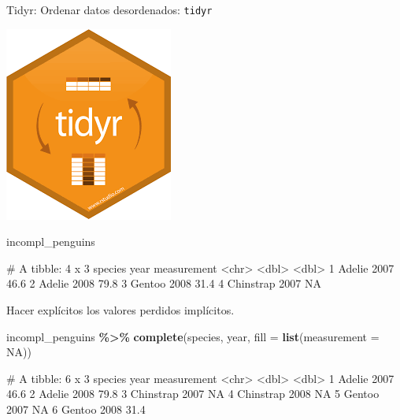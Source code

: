 \documentclass[
  ignorenonframetext,
  aspectratio=169]{beamer}
\newenvironment{Shaded}{\begin{snugshade}}{\end{snugshade}}
\newcommand{\AttributeTok}[1]{\textcolor[rgb]{0.13,0.29,0.53}{#1}}
\newcommand{\ConstantTok}[1]{\textcolor[rgb]{0.56,0.35,0.01}{#1}}
\newcommand{\FunctionTok}[1]{\textcolor[rgb]{0.13,0.29,0.53}{\textbf{#1}}}
\newcommand{\NormalTok}[1]{#1}
\newcommand{\SpecialCharTok}[1]{\textcolor[rgb]{0.81,0.36,0.00}{\textbf{#1}}}
\let\oldverbatim\verbatim
\let\endoldverbatim\endverbatim
\renewenvironment{verbatim}{\tiny\oldverbatim}{\endoldverbatim}
\begin{document}
\begin{frame}[fragile]{Tidyr: Ordenar datos desordenados:
\texttt{tidyr}}
\label{tidyr-ordenar-datos-desordenados-tidyr-14}
\begin{flushright}\includegraphics[width=0.05\linewidth]{Imgs/logo_tidyr} \end{flushright}

\begin{Shaded}
\begin{Highlighting}[]
\NormalTok{incompl\_penguins}
\end{Highlighting}
\end{Shaded}

\begin{verbatim}
# A tibble: 4 x 3
  species    year measurement
  <chr>     <dbl>       <dbl>
1 Adelie     2007        46.6
2 Adelie     2008        79.8
3 Gentoo     2008        31.4
4 Chinstrap  2007        NA  
\end{verbatim}

Hacer explícitos los valores perdidos implícitos.

\begin{Shaded}
\begin{Highlighting}[]
\NormalTok{incompl\_penguins }\SpecialCharTok{\%\textgreater{}\%} 
  \FunctionTok{complete}\NormalTok{(species, year, }\AttributeTok{fill =} \FunctionTok{list}\NormalTok{(}\AttributeTok{measurement =} \ConstantTok{NA}\NormalTok{))}
\end{Highlighting}
\end{Shaded}

\begin{verbatim}
# A tibble: 6 x 3
  species    year measurement
  <chr>     <dbl>       <dbl>
1 Adelie     2007        46.6
2 Adelie     2008        79.8
3 Chinstrap  2007        NA  
4 Chinstrap  2008        NA  
5 Gentoo     2007        NA  
6 Gentoo     2008        31.4
\end{verbatim}
\end{frame}
\end{document}
